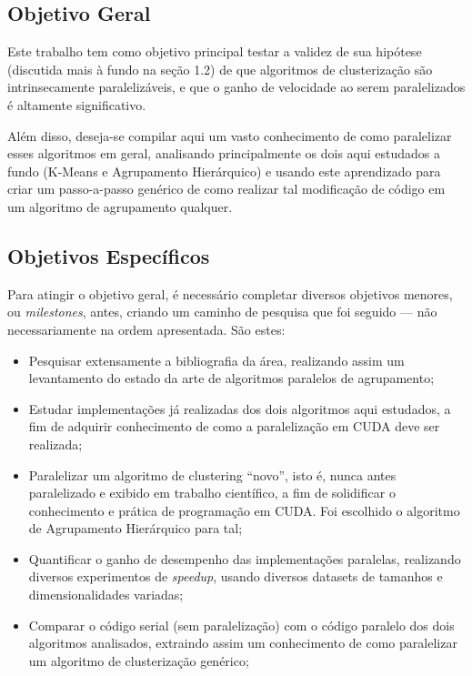\documentclass[12pt, %
openright, 
oneside, %
a4paper,    %
brazil]{facom-ufu-abntex2}
\def\qntAlgrtm{dois}
\begin{document}

\subsection{Objetivo Geral}

Este trabalho tem como objetivo principal testar a validez de sua hipótese (discutida mais à fundo na seção 1.2) de que algoritmos de clusterização são intrinsecamente paralelizáveis, e que o ganho de velocidade ao serem paralelizados é altamente significativo.

Além disso, deseja-se compilar aqui um vasto conhecimento de como paralelizar esses algoritmos em geral, analisando principalmente os \qntAlgrtm{} aqui estudados a fundo (K-Means e Agrupamento Hierárquico) e usando este aprendizado para criar um passo-a-passo genérico de como realizar tal modificação de código em um algoritmo de agrupamento qualquer.




\subsection{Objetivos Específicos}

Para atingir o objetivo geral, é necessário completar diversos objetivos menores, ou \textit{milestones}, antes, criando um caminho de pesquisa que foi seguido --- não necessariamente na ordem apresentada. São estes:

\begin{itemize}
  \item Pesquisar extensamente a bibliografia da área, realizando assim um levantamento do estado da arte de algoritmos paralelos de agrupamento;
  
  \item Estudar implementações já realizadas dos \qntAlgrtm{} algoritmos aqui estudados, a fim de adquirir conhecimento de como a paralelização em CUDA deve ser realizada;
  
  \item Paralelizar um algoritmo de clustering \enquote{novo}, isto é, nunca antes paralelizado e exibido em trabalho científico, a fim de solidificar o conhecimento e prática de programação em CUDA. Foi escolhido o algoritmo de Agrupamento Hierárquico para tal;
  
  \item Quantificar o ganho de desempenho das implementações paralelas, realizando diversos experimentos de \textit{speedup}, usando diversos datasets de tamanhos e dimensionalidades variadas;
  
  \item Comparar o código serial (sem paralelização) com o código paralelo dos \qntAlgrtm{} algoritmos analisados, extraindo assim um conhecimento de como paralelizar um algoritmo de clusterização genérico;
\end{itemize}
\end{document}
